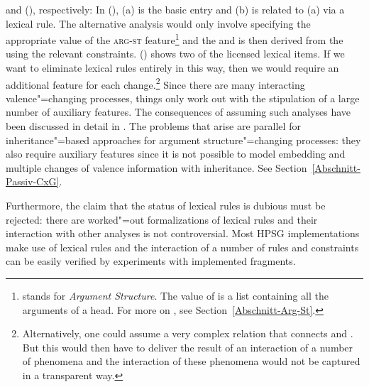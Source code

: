 and (), respectively:
\eal
\ex {}
\ex {}
\zl
\addlines
In (), (a) is the basic entry and (b) is related to (a) via a lexical
rule. The alternative analysis would only involve specifying the appropriate value
of the \textsc{arg-st} feature\footnote{%
\argst stands for \emph{Argument Structure}. The value of \argst is a list containing all the arguments
of a head. For more on \argst, see Section~\ref{Abschnitt-Arg-St}.
} and the \comps and \slashv is then derived from the \argstv using the relevant constraints.
() shows two of the licensed lexical items.
\eal
\ex {}
\ex {}
\zl
If we want to eliminate lexical rules entirely in this way, then we would require an additional feature for each change.\footnote{%
Alternatively, one could assume a very complex relation that connects \argst and \comps. But this would then have to deliver
the result of an interaction of a number of phenomena and the interaction of these phenomena would not be captured in a transparent way.%
} Since there are many interacting valence"=changing processes, things only work out with the stipulation of a large number of auxiliary
features. The consequences of assuming such analyses have been discussed in detail in
. The problems that arise are parallel for
inheritance"=based approaches for argument structure"=changing processes: they also require
auxiliary features since it is not possible to model embedding and multiple changes of valence information with inheritance. See Section~\ref{Abschnitt-Passiv-CxG}.

Furthermore, the claim that the status of lexical rules is dubious must be rejected: there are worked"=out formalizations of lexical rules \citep{Meurers2001a,CB92a,LC99a}
and their interaction with other analyses is not controversial. Most HPSG implementations make use of lexical rules and the interaction of a number of rules and
constraints can be easily verified by experiments with implemented fragments.


